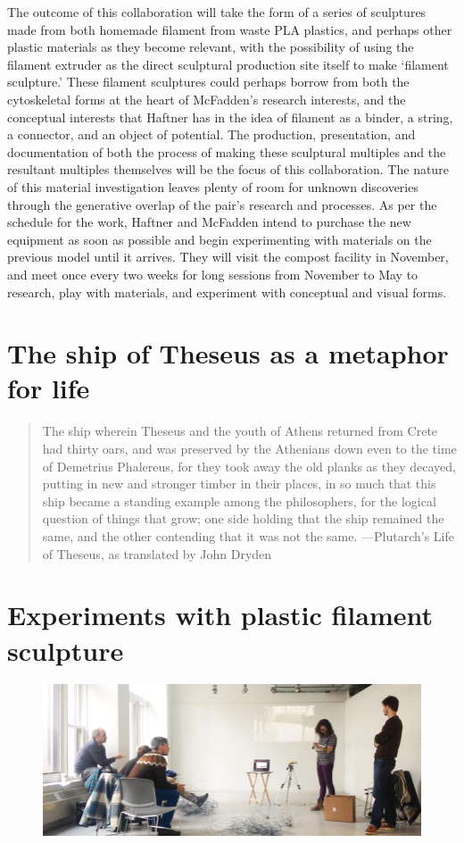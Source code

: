 The outcome of this collaboration will take the form of a series of sculptures made from both homemade filament from waste PLA plastics, and perhaps other plastic materials as they become relevant, with the possibility of using the filament extruder as the direct sculptural production site itself to make ‘filament sculpture.’ These filament sculptures could perhaps borrow from both the cytoskeletal forms at the heart of McFadden’s research interests, and the conceptual interests that Haftner has in the idea of filament as a binder, a string, a connector, and an object of potential. The production, presentation, and documentation of both the process of making these sculptural multiples and the resultant multiples themselves will be the focus of this collaboration. The nature of this material investigation leaves plenty of room for unknown discoveries through the generative overlap of the pair’s research and processes. As per the schedule for the work, Haftner and McFadden intend to purchase the new equipment as soon as possible and begin experimenting with materials on the previous model until it arrives. They will visit the compost facility in November, and meet once every two weeks for long sessions from November to May to research, play with materials, and experiment with conceptual and visual forms.

\section{The ship of Theseus as a metaphor for life}



{
\blockquote{ The ship wherein Theseus and the youth of Athens returned from Crete had thirty oars, and was preserved by the Athenians down even to the time of Demetrius Phalereus, for they took away the old planks as they decayed, putting in new and stronger timber in their places, in so much that this ship became a standing example among the philosophers, for the logical question of things that grow; one side holding that the ship remained the same, and the other contending that it was not the same. ---Plutarch's Life of Theseus, as translated by John Dryden }
}

\section{Experiments with plastic filament sculpture}

\begin{figure}[h!]
\centering
\includegraphics[width=\hsize]{art/collab1.jpg}
\caption{\label{fig:art_2}  }
\end{figure}

